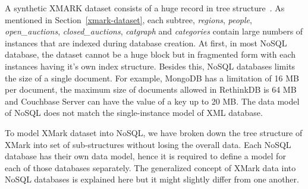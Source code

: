A synthetic XMARK dataset consists of a huge record in tree structure~\citep{xmark/VIST}. As mentioned in Section~\ref{xmark-dataset}, each subtree, \textit{regions}, \textit{people}, \textit{open\_auctions}, \textit{closed\_auctions}, \textit{catgraph} and \textit{categories} contain large numbers of instances that are indexed during database creation. At first, in most NoSQL database, the dataset cannot be a huge block but in fragmented form with each instances having it's own index structure. Besides this, NoSQL databases limits the size of a single document. For example, MongoDB has a limitation of 16 MB per document, the maximum size of documents allowed in RethinkDB is 64 MB and Couchbase Server can have the value of a key up to 20 MB. The data model of NoSQL does not match the single-instance model of XML database.
\par 
To model XMark dataset into NoSQL, we have broken down the tree structure of XMark into set of sub-structures without losing the overall data. Each NoSQL database has their own data model, hence it is required to define a model for each of those databases separately. The generalized concept of  XMark data into NoSQL databases is explained here but it might slightly differ from one another. 

